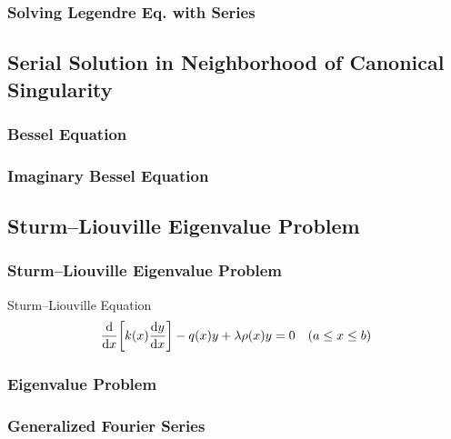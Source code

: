 \documentclass[UTF8]{ctexart} %
\numberwithin{equation}{section}
\begin{document}
\subsubsection{Solving Legendre Eq. with Series}

\subsection{Serial Solution in Neighborhood of Canonical Singularity}
\subsubsection{}
\subsubsection{}

\subsubsection{Bessel Equation}

\subsubsection{Imaginary Bessel Equation}

\subsection{Sturm–Liouville Eigenvalue Problem}
\subsubsection{Sturm–Liouville Eigenvalue Problem}
Sturm–Liouville Equation
\begin{equation}\label{key}
\dv{x}\qty[k(x)\dv{y}{x}] - q(x)y + \lambda\rho(x)y = 0 \quad (a\leq x\leq b)
\end{equation}

\subsubsection{Eigenvalue Problem}

\subsubsection{Generalized Fourier Series}
\end{document}
